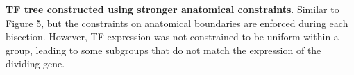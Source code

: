 \textbf{TF tree constructed using stronger anatomical constraints}. 
Similar to Figure 5, but the constraints on anatomical boundaries are enforced during each bisection. However, TF expression was not constrained to be uniform within a group, leading to some subgroups that do not match the expression of the dividing gene.
